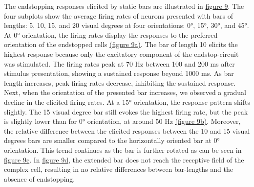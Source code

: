 \documentclass[12pt]{article}
\begin{document}
The endstopping responses elicited by static bars are illustrated in \hyperref[fig:endstopping]{figure 9}. The four subplots show the average firing rates of neurons presented with bars of lengths: 5, 10, 15, and 20 visual degrees at four orientations: 0°, 15°, 30°, and 45°. At 0° orientation, the firing rates display the responses to the preferred orientation of the endstopped cells \hyperref[fig:endstopping]{(figure 9a)}. The bar of length 10 elicits the highest response because only the excitatory component of the endstop-circuit was stimulated. The firing rates peak at 70 Hz between 100 and 200 ms after stimulus presentation, showing a sustained response beyond 1000 ms. As bar length increases, peak firing rates decrease, inhibiting the sustained response. Next, when the orientation of the presented bar increases, we observed a gradual decline in the elicited firing rates. At a 15° orientation, the response pattern shifts slightly. The 15 visual degree bar still evokes the highest firing rate, but the peak is slightly lower than for 0° orientation, at around 50 Hz \hyperref[fig:endstopping]{(figure 9b)}. Moreover, the relative difference between the elicited responses between the 10 and 15 visual degrees bars are smaller compared to the horizontally oriented bar at 0° orientation. This trend continues as the bar is further rotated as can be seen in \hyperref[fig:endstopping]{figure 9c}. In \hyperref[fig:endstopping]{figure 9d}, the extended bar does not reach the receptive field of the complex cell, resulting in no relative differences between bar-lengths and the absence of endstopping. 
\end{document}
